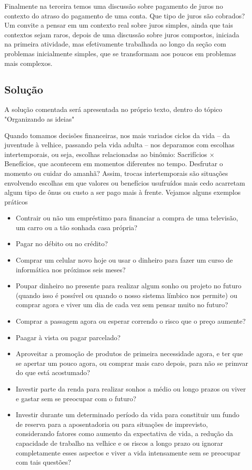 \begin{texto}
{Finalmente na terceira temos uma discussão sobre pagamento de juros no contexto do atraso do pagamento de uma conta. Que tipo de juros são cobrados? Um convite a pensar em um contexto real sobre juros simples, ainda que tais contextos sejam raros, depois de uma discussão sobre juros compostos, iniciada na primeira atividade, mas efetivamente trabalhada ao longo da seção com problemas inicialmente simples, que se transformam aos poucos em problemas mais complexos.

\subsection{Solução}
A solução comentada será apresentada no próprio texto, dentro do tópico "Organizando as ideias"
}
\end{texto}
\label{fin-exp-3}
Quando tomamos decisões financeiras, nos mais variados ciclos da vida – da juventude à velhice, passando pela vida adulta – nos deparamos com escolhas intertemporais, ou seja, escolhas relacionadas ao binômio: Sacrifícios $\times$ Benefícios, que acontecem em momentos diferentes no tempo. Desfrutar o momento ou cuidar do amanhã? Assim, trocas intertemporais \citep{fonseca2005} são situações envolvendo escolhas em que valores ou benefícios usufruídos mais cedo acarretam algum tipo de ônus ou custo a ser pago mais à frente. Vejamos alguns exemplos práticos

\begin{itemize}
  \item Contrair ou não um empréstimo para financiar a compra de uma televisão, um carro ou a tão sonhada casa própria?
  \item Pagar no débito ou no crédito?
  \item Comprar um celular novo hoje ou usar o dinheiro para fazer um curso de informática nos próximos seis meses?
  \item Poupar dinheiro no presente para realizar algum sonho ou projeto no futuro (quando isso é possível ou quando o nosso sistema límbico nos permite) ou comprar agora e viver um dia de cada vez sem pensar muito no futuro?
  \item Comprar a passagem agora ou esperar correndo o risco que o preço aumente?
  \item Paagar à vista ou pagar parcelado?
  \item Aproveitar a promoção de produtos de primeira necessidade agora, e ter que se apertar um pouco agora, ou comprar mais caro depois, para não se primvar do que está acostumado?
  \item Investir parte da renda para realizar sonhos a médio ou longo prazos ou viver e gastar sem se preocupar com o futuro?
  \item Investir durante um determinado período da vida para constituir um fundo de reserva para a aposentadoria ou para situações de imprevisto, considerando fatores como aumento da expectativa de vida, a redução da capacidade de trabalho na velhice e os riscos a longo prazo ou ignorar completamente esses aspectos e viver a vida intensamente sem se preocupar com tais questões?
\end{itemize}

